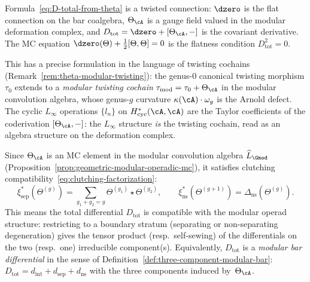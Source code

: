 \begin{remark}
\label{rem:D-tot-as-connection}%
\label{rem:theta-as-curved-twisting}%
Formula~\eqref{eq:D-total-from-theta} is a twisted connection:
$\dzero$ is the flat connection on the bar coalgebra,
$\Theta_\cA$ is a gauge field valued in the modular deformation
complex, and $D_{\mathrm{tot}} = \dzero + [\Theta_\cA, -]$ is
the covariant derivative.
The MC equation
$\dzero(\Theta) + \tfrac{1}{2}[\Theta, \Theta] = 0$
is the flatness condition $D_{\mathrm{tot}}^2 = 0$.

This has a precise formulation in the language of twisting cochains
(Remark~\ref{rem:theta-modular-twisting}):
the genus-$0$ canonical twisting morphism $\tau_0$ extends to a
\emph{modular twisting cochain}
$\tau_{\mathrm{mod}} = \tau_0 + \Theta_\cA$
in the modular convolution algebra, whose genus-$g$ curvature
$\kappa(\cA)\cdot\omega_g$ is the Arnold defect.
The cyclic $L_\infty$ operations $\{l_n\}$ on
$H^*_{\mathrm{cyc}}(\cA,\cA)$ are the Taylor coefficients of the
coderivation $[\Theta_\cA, -]$: the $L_\infty$ structure \emph{is}
the twisting cochain, read as an algebra structure on the
deformation complex.
\end{remark}

\begin{remark}
\label{rem:clutching-D-tot}
Since $\Theta_\cA$ is an MC element in the modular convolution
algebra $\widehat{L}_{\Gmod}$
(Proposition~\ref{prop:geometric-modular-operadic-mc}),
it satisfies clutching
compatibility~\eqref{eq:clutching-factorization}:
\[
\xi_{\mathrm{sep}}^*(\Theta^{(g)})
= \sum_{g_1+g_2=g} \Theta^{(g_1)} \star \Theta^{(g_2)},
\qquad
\xi_{\mathrm{ns}}^*(\Theta^{(g+1)})
= \Delta_{\mathrm{ns}}(\Theta^{(g)}).
\]
This means the total differential $D_{\mathrm{tot}}$ is
compatible with the modular operad structure: restricting to a
boundary stratum (separating or non-separating degeneration) gives
the tensor product (resp.\ self-sewing) of the differentials on the
two (resp.\ one) irreducible component(s). Equivalently,
$D_{\mathrm{tot}}$ is a \emph{modular bar differential} in the
sense of Definition~\ref{def:three-component-modular-bar}:
$D_{\mathrm{tot}} = d_{\mathrm{int}} + d_{\mathrm{sep}} +
d_{\mathrm{ns}}$ with the three components induced by~$\Theta_\cA$.
\end{remark}

